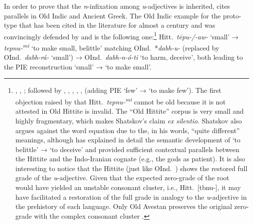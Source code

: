 \documentclass[output=paper,colorlinks,citecolor=brown]{langscibook}
\begin{document}
In order to prove that the \textit{n}-infixation among \textit{u}-adjectives is inherited, \citet{Koch1973} cites parallels in Old Indic and Ancient Greek. The Old Indic example for the proto-type that has been cited in the literature for almost a century and was convincingly defended by \citet[164--165]{Oettinger1979} and \citet{Koch1980} is the following one:\footnote{\citealt[69]{GotzePedersen1934}, \citealt[231]{Kammenhuber1969}, ; followed by \citealt[164--165]{Oettinger1979}, \citealt[27]{Tucker1981}, \citealt[385--386]{Praust2004}, \citealt[208--210]{Steer2015}, \citealt[2162]{LundquistYates2018}, \citealt[157]{Oettinger2022} (adding PIE  ‘few’ →  ‘to make few’). The first objection raised by \citet[277]{Shatskov2020} that Hitt.\ \textit{tepnu-\textsuperscript{mi}} cannot be old because it is not attested in Old Hittite is invalid. The “Old Hittite” corpus is very small and highly fragmentary, which makes Shatskov’s claim \emph{ex silentio}. Shatskov also argues against the word equation due to the, in his words, “quite different” meanings, although \citet[225--232]{Koch1980}  has explained in detail the semantic development of ‘to belittle’ → ‘to deceive’ and provided sufficient contextual parallels between the Hittite and the Indo-Iranian cognate (e.g., the gods as patient). It is also interesting to notice that the Hittite   (just like OInd.\ ) shows the restored full grade of the \textit{u}-adjective. Given that the expected zero-grade of the root would have yielded an unstable consonant cluster, i.e., Hitt.\ [tbnu-], it may have facilitated a restoration of the full grade in analogy to the \textit{u}-adjective in the prehistory of each language. Only Old Avestan  preserves the original zero-grade with the complex consonant cluster \citep[164]{Oettinger1979}.} Hitt.\ \textit{tēpu-/-aw-} ‘small’ → \textit{tepnu-\textsuperscript{mi}}  ‘to make small, belittle’ matching OInd.\ *\textit{dabh-u-} (replaced by OInd.\ \textit{dabh-rá-} ‘small’) → OInd.\ \textit{dabh-n-ó-ti} ‘to harm, deceive’, both leading to the PIE reconstruction  ‘small’ →  ‘to make small’.
\end{document}
